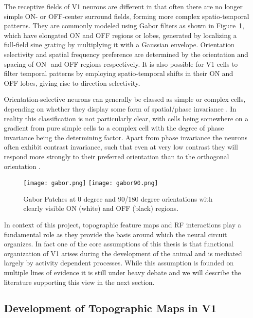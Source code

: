 The receptive fields of V1 neurons are different in that often there are no
longer simple ON- or OFF-center surround fields, forming more complex
spatio-temporal patterns. They are commonly modeled using Gabor filters
as shown in Figure~\ref{Gabor}, which have elongated ON and OFF
regions or lobes, generated by localizing a full-field sine grating
by multiplying it with a Gaussian envelope. Orientation selectivity and spatial
frequency preference are determined by the orientation and spacing of
ON- and OFF-regions respectively. It is also possible for V1 cells to
filter temporal patterns by employing spatio-temporal shifts in their
ON and OFF lobes, giving rise to direction selectivity.

Orientation-selective neurons can generally be classed as simple or
complex cells, depending on whether they display some form of
spatial/phase invariance \citep{Skottun1991}. In reality this
classification is not particularly clear, with cells being somewhere
on a gradient from pure simple cells to a complex cell with the degree
of phase invariance being the determining factor. Apart from phase
invariance the neurons often exhibit contrast invariance, such that
even at very low contrast they will respond more strongly to their
preferred orientation than to the orthogonal orientation
\citep{Sclar1982}.

\begin{figure}
	\centering \texttt{[image: gabor.png]}
        \texttt{[image: gabor90.png]}
	\caption[Oriented Gabor patches.]{Gabor Patches at 0 degree and
      90/180 degree orientations with clearly visible ON (white) and
      OFF (black) regions.}
	\label{Gabor}
\end{figure}

In context of this project, topographic feature maps and RF
interactions play a fundamental role as they provide the basis around
which the neural circuit organizes. In fact one of the core
assumptions of this thesis is that functional organization of V1
arises during the development of the animal and is mediated largely by
activity dependent processes. While this assumption is founded on
multiple lines of evidence it is still under heavy debate and we will
describe the literature supporting this view in the next section.

\subsection{Development of Topographic Maps in V1}

